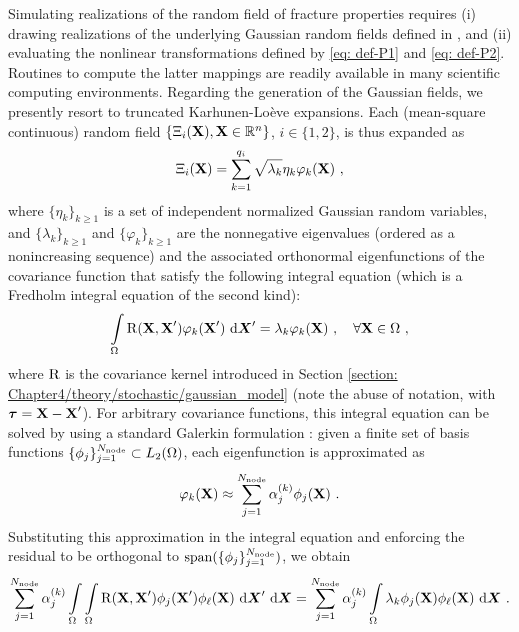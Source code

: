 Simulating realizations of the random field of fracture properties requires (i) drawing realizations of the underlying Gaussian random fields defined in , and (ii) evaluating the nonlinear transformations defined by \eqref{eq: def-P1} and \eqref{eq: def-P2}. Routines to compute the latter mappings are readily available in many scientific computing environments. Regarding the generation of the Gaussian fields, we presently resort to truncated Karhunen-Lo\`eve expansions. Each (mean-square continuous) random field $\{\Xi_i(\textbf{X}), \textbf{X} \in \mathbb{R}^n\}$, $i \in \{1,2\}$, is thus expanded as
\begin{align}
  \Xi_i(\textbf{X}) = \sum\limits_{k=1}^{q_i} \sqrt{\lambda_k} \eta_k \varphi_k(\textbf{X})~,
\end{align}
where $\{\eta_k\}_{k \geqslant 1}$ is a set of independent normalized Gaussian random variables, and $\{\lambda_k\}_{k \geqslant 1}$ and $\{\varphi_k\}_{k \geqslant 1}$ are the nonnegative eigenvalues (ordered as a nonincreasing sequence) and the associated orthonormal eigenfunctions of the covariance function that satisfy the following integral equation (which is a Fredholm integral equation of the second kind):
\begin{align}
  \int\limits_\Omega \operatorname{R}(\textbf{X},\textbf{X}')\varphi_k(\textbf{X}') \text{ d}\boldsymbol{X}' = \lambda_k\varphi_k(\textbf{X})~, \quad \forall \textbf{X} \in \Omega~, \label{eq: FIE2}
\end{align}
where $\operatorname{R}$ is the covariance kernel introduced in Section \ref{section: Chapter4/theory/stochastic/gaussian_model} (note the abuse of notation, with $\boldsymbol{\tau} = \textbf{X} - \textbf{X}'$). For arbitrary covariance functions, this integral equation can be solved by using a standard Galerkin formulation \cite{GhanemSpanos,LMK2010}: given a finite set of basis functions $\{\phi_j\}_{j=1}^{N_\text{node}} \subset L_2(\Omega)$,
each eigenfunction is approximated as
\begin{align}
  \varphi_k(\textbf{X}) \approx \sum_{j=1}^{N_{\text{node}}} \alpha_{j}^{(k)}\phi_j(\textbf{X})~. \label{eq: eigenfunction approximation}
\end{align}
Substituting this approximation in the integral equation and enforcing the residual to be orthogonal to $\operatorname{span}(\{\phi_j\}_{j=1}^{N_\text{node}})$, we obtain
\begin{align}
  \sum_{j=1}^{N_{\text{node}}} \alpha_{j}^{(k)} \int\limits_\Omega \int\limits_\Omega \operatorname{R}(\textbf{X},\textbf{X}') \phi_j(\textbf{X}')\phi_\ell(\textbf{X}) \text{ d}\boldsymbol{X}' \text{ d}\boldsymbol{X} = \sum_{j=1}^{N_{\text{node}}} \alpha_{j}^{(k)} \int\limits_\Omega \lambda_k \phi_j(\textbf{X})\phi_\ell(\textbf{X}) \text{ d}\boldsymbol{X}~. \label{eq: gevp}
\end{align}
